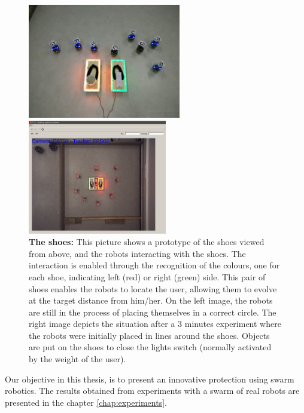 \documentclass[oneside, a4paper, 12pt]{memoir}
\let\oldCaption\caption
\renewcommand{\caption}[2]{
\oldCaption[#1]{{\small\sffamily\bfseries #1:} #2}
}
\begin{document}
	\begin{figure}[!htp]
		\begin{minipage}[c]{0.6\textwidth}
			\includegraphics[trim=200px 300px 140px 300px, clip=true, height=5cm]{images/shoes.jpg}
		\end{minipage}
		\hfill
		\begin{minipage}[c]{0.39\textwidth}
			\hfill\includegraphics[trim=380px 230px 380px 360px, clip=true, height=5cm]{../Experiments/No_Human/6end.png}
		\end{minipage}				
		
		\caption{The shoes}{This picture shows a prototype of the shoes viewed from above, and the robots interacting with the shoes. The interaction is enabled through the recognition of the colours, one for each shoe, indicating left (red) or right (green) side. This pair of shoes enables the robots to locate the user, allowing them to evolve at the target distance from him/her. On the left image, the robots are still in the process of placing themselves in a correct circle. The right image depicts the situation after a 3 minutes experiment where the robots were initially placed in lines around the shoes. Objects are put on the shoes to close the lights switch (normally activated by the weight of the user).}
		\label{fig:shoes}
	\end{figure}

Our objective in this thesis, is to present an innovative protection using swarm robotics. The results obtained from experiments with a swarm of real robots are presented in the chapter \ref{chap:experiments}.
\end{document}

